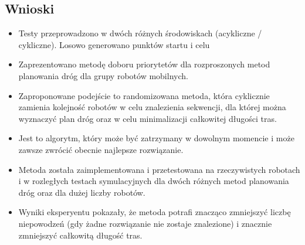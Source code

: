 \subsection{Wnioski}
\begin{itemize}
	\item Testy przeprowadzono w dwóch różnych środowiskach (acykliczne / cykliczne). Losowo generowano punktów startu i celu
	\item Zaprezentowano metodę doboru priorytetów dla rozproszonych metod planowania dróg dla grupy robotów mobilnych.
	\item Zaproponowane podejście to randomizowana metoda, która cyklicznie zamienia kolejność robotów w celu znalezienia sekwencji, dla której można wyznaczyć plan dróg oraz w celu minimalizacji całkowitej długości tras.
	\item Jest to algorytm, który może być zatrzymany w dowolnym momencie i może zawsze zwrócić obecnie najlepsze rozwiązanie.
	\item Metoda została zaimplementowana i przetestowana na rzeczywistych robotach i w rozległych testach symulacyjnych dla dwóch różnych metod planowania dróg oraz dla dużej liczby robotów.
	\item Wyniki eksperyentu pokazały, że metoda potrafi znacząco zmniejszyć liczbę niepowodzeń (gdy żadne rozwiązanie nie zostaje znalezione) i znacznie zmniejszyć całkowitą długość tras.
\end{itemize}
